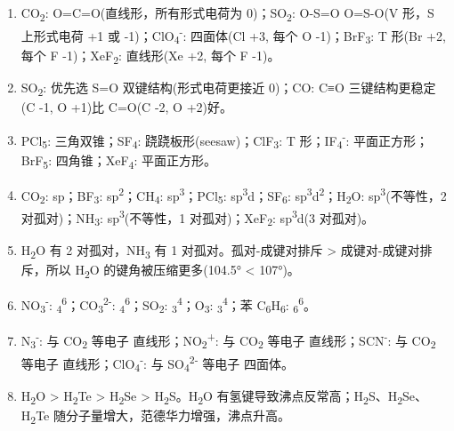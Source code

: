 \begin{enumerate}
\def\labelenumi{\arabic{enumi}.}
\setcounter{enumi}{4}
\item
  CO\textsubscript{2}: O=C=O(直线形，所有形式电荷为 0)；SO\textsubscript{2}: O-S=O  O=S-O(V 形，S 上形式电荷 +1 或 -1)；ClO\textsubscript{4}\textsuperscript{-}: 四面体(Cl +3, 每个 O -1)；BrF\textsubscript{3}: T 形(Br +2, 每个 F -1)；XeF\textsubscript{2}: 直线形(Xe +2, 每个 F -1)。
\item
  SO\textsubscript{2}: 优先选 S=O 双键结构(形式电荷更接近 0)；CO: C≡O 三键结构更稳定(C -1, O +1)比 C=O(C -2, O +2)好。
\item
  PCl\textsubscript{5}: 三角双锥；SF\textsubscript{4}: 跷跷板形(seesaw)；ClF\textsubscript{3}: T 形；IF\textsubscript{4}\textsuperscript{-}: 平面正方形；BrF\textsubscript{5}: 四角锥；XeF\textsubscript{4}: 平面正方形。
\item
  CO\textsubscript{2}: sp；BF\textsubscript{3}: sp\textsuperscript{2}；CH\textsubscript{4}: sp\textsuperscript{3}；PCl\textsubscript{5}: sp\textsuperscript{3}d；SF\textsubscript{6}: sp\textsuperscript{3}d\textsuperscript{2}；H\textsubscript{2}O: sp\textsuperscript{3}(不等性，2 对孤对)；NH\textsubscript{3}: sp\textsuperscript{3}(不等性，1 对孤对)；XeF\textsubscript{2}: sp\textsuperscript{3}d(3 对孤对)。
\item
  H\textsubscript{2}O 有 2 对孤对，NH\textsubscript{3} 有 1 对孤对。孤对-成键对排斥 \textgreater{} 成键对-成键对排斥，所以 H\textsubscript{2}O 的键角被压缩更多(104.5° \textless{} 107°)。
\item
  NO\textsubscript{3}\textsuperscript{-}: \派\textsubscript{4}\textsuperscript{6}；CO\textsubscript{3}\textsuperscript{2-}: \派\textsubscript{4}\textsuperscript{6}；SO\textsubscript{2}: \派\textsubscript{3}\textsuperscript{4}；O\textsubscript{3}: \派\textsubscript{3}\textsuperscript{4}；苯 C\textsubscript{6}H\textsubscript{6}: \派\textsubscript{6}\textsuperscript{6}。
\item
  N\textsubscript{3}\textsuperscript{-}: 与 CO\textsubscript{2} 等电子 \箭 直线形；NO\textsubscript{2}\textsuperscript{+}: 与 CO\textsubscript{2} 等电子 \箭 直线形；SCN\textsuperscript{-}: 与 CO\textsubscript{2} 等电子 \箭 直线形；ClO\textsubscript{4}\textsuperscript{-}: 与 SO\textsubscript{4}\textsuperscript{2-} 等电子 \箭 四面体。
\item
  H\textsubscript{2}O \textgreater{} H\textsubscript{2}Te \textgreater{} H\textsubscript{2}Se \textgreater{} H\textsubscript{2}S。H\textsubscript{2}O 有氢键导致沸点反常高；H\textsubscript{2}S、H\textsubscript{2}Se、H\textsubscript{2}Te 随分子量增大，范德华力增强，沸点升高。

\end{enumerate}
